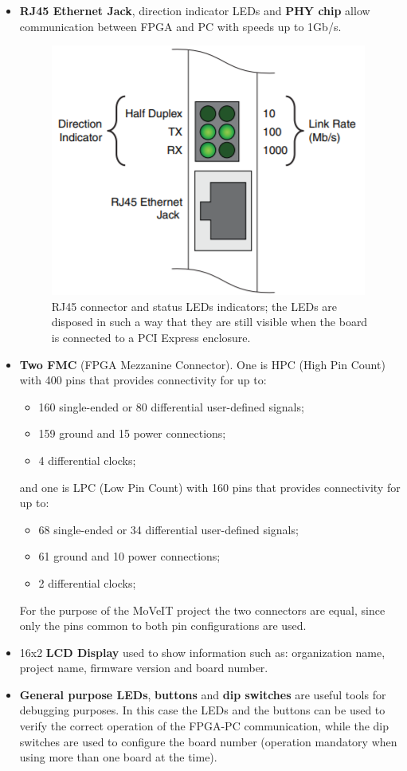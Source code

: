 \begin{itemize}
	\item \textbf{RJ45 Ethernet Jack}, direction indicator LEDs and \textbf{PHY chip} allow communication between FPGA and PC with speeds up to 1Gb/s.
	 \begin{figure}[H]
	 	\centering
	 	\includegraphics[width=0.2\linewidth]{IMG/ch3/PHY}
	 	\caption{RJ45 connector and status LEDs indicators; the LEDs are disposed in such a way that they are still visible when the board is connected to a PCI Express enclosure.}
	 	\label{fig:phy}
	 \end{figure}
	\item \textbf{Two FMC} (FPGA Mezzanine Connector). One is HPC (High Pin Count) with 400 pins that provides connectivity for up to:
	\begin{itemize}
		\item 160 single-ended or 80 differential user-defined signals;
		\item 159 ground and 15 power connections;
		\item 4 differential clocks;
	\end{itemize}
	\noindent and one is LPC (Low Pin Count) with 160 pins that provides connectivity for up to:
	\begin{itemize}
		\item 68 single-ended or 34 differential user-defined signals;
		\item 61 ground and 10 power connections;
		\item 2 differential clocks;
	\end{itemize}
	For the purpose of the MoVeIT project the two connectors are equal, since only the pins common to both pin configurations are used.
	\item 16x2 \textbf{LCD Display} used to show information such as: organization name, project name, firmware version and board number.
	\item \textbf{General purpose LEDs}, \textbf{buttons} and \textbf{dip switches} are useful tools for debugging purposes. In this case the LEDs and the buttons can be used to verify the correct operation of the FPGA-PC communication, while the dip switches are used to configure the board number (operation mandatory when using more than one board at the time).  

\end{itemize}
